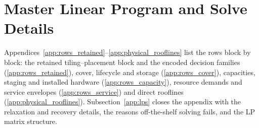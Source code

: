 \section{Master Linear Program and Solve Details}
\label{app:master_rows}\label{app:master_v3}
Appendices~\ref{app:rows_retained}--\ref{app:physical_rooflines} list the rows block by block: the retained tiling--placement block and the encoded decision families (\ref{app:rows_retained}), cover, lifecycle and storage (\ref{app:rows_cover}), capacities, staging and installed hardware (\ref{app:rows_capacity}), resource demands and service envelopes (\ref{app:rows_service}) and direct rooflines (\ref{app:physical_rooflines}).
Subsection~\ref{app:lps} closes the appendix with the relaxation and recovery details, the reasons off-the-shelf solving fails, and the LP matrix structure.

